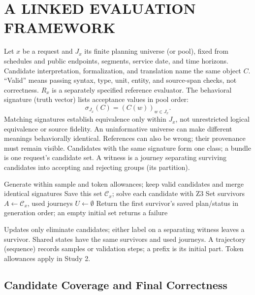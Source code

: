 \documentclass[a4paper,twoside]{article}
\begin{document}
\section{\uppercase{A Linked Evaluation Framework}}
\label{sec:framework}

\noindent Let $x$ be a request and $J_x$ its finite planning universe (or pool), fixed from schedules and public endpoints, segments, service date, and time horizons. Candidate interpretation, formalization, and translation name the same object $C$. ``Valid'' means passing syntax, type, unit, entity, and source-span checks, not correctness. $R_x$ is a separately specified reference evaluator. The behavioral signature (truth vector) lists acceptance values in pool order:
\begin{equation}
  \sigma_{J_x}(C)=(C(w))_{w\in J_x}.
\end{equation}
Matching signatures establish equivalence only within $J_x$, not unrestricted logical equivalence or source fidelity. An uninformative universe can make different meanings behaviorally identical. References can also be wrong; their provenance must remain visible.
Candidates with the same signature form one class; a bundle is one request's candidate set. A witness is a journey separating surviving candidates into accepting and rejecting groups (its partition).

\begin{algorithm}[ht]
\caption{Evaluated pipeline (no candidate repair)}
\label{alg:pipeline}
Generate within sample and token allowances; keep valid candidates and merge identical signatures\;
Save this set $\mathcal C_x$; solve each candidate with Z3\;
Set survivors $A\leftarrow\mathcal C_x$, used journeys $U\leftarrow\emptyset$\;
Return the first survivor's saved plan/status in generation order; an empty initial set returns a failure\;
\end{algorithm}
Updates only eliminate candidates; either label on a separating witness leaves a survivor. Shared states have the same survivors and used journeys. A trajectory (sequence) records samples or validation steps; a prefix is its initial part. Token allowances apply in Study 2.



\subsection{Candidate Coverage and Final Correctness}
\end{document}
